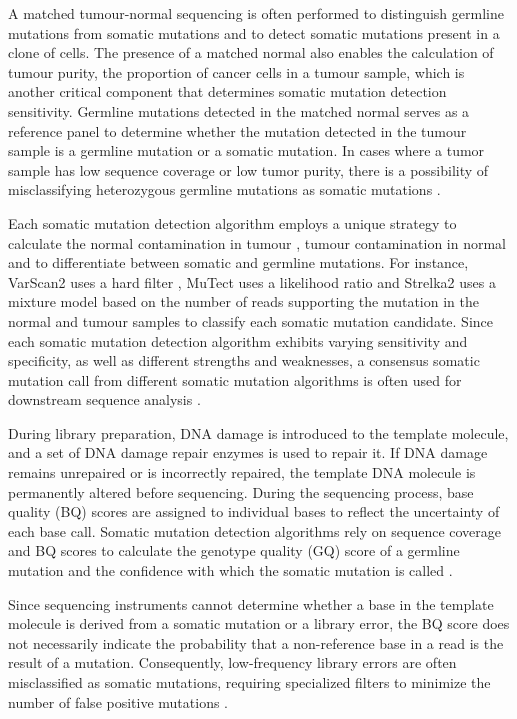 A matched tumour-normal sequencing is often performed to distinguish germline mutations from somatic mutations and to detect somatic mutations present in a clone of cells. The presence of a matched normal also enables the calculation of tumour purity, the proportion of cancer cells in a tumour sample, which is another critical component that determines somatic mutation detection sensitivity. Germline mutations detected in the matched normal serves as a reference panel to determine whether the mutation detected in the tumour sample is a germline mutation or a somatic mutation. In cases where a tumor sample has low sequence coverage or low tumor purity, there is a possibility of misclassifying heterozygous germline mutations as somatic mutations \cite{Cibulskis2013-gw}.

Each somatic mutation detection algorithm employs a unique strategy to calculate the normal contamination in tumour \cite{Cibulskis2011-tp}, tumour contamination in normal \cite{Taylor-Weiner2018-af} and to differentiate between somatic and germline mutations. For instance, VarScan2 uses a hard filter \cite{Koboldt2012-wd}, MuTect uses a likelihood ratio \cite{Cibulskis2013-gw} and Strelka2 uses a mixture model \cite{Kim2018-qi} based on the number of reads supporting the mutation in the normal and tumour samples to classify each somatic mutation candidate. Since each somatic mutation detection algorithm exhibits varying sensitivity and specificity, as well as different strengths and weaknesses, a consensus somatic mutation call from different somatic mutation algorithms is often used for downstream sequence analysis \cite{Bailey2020-ou}.

During library preparation, DNA damage is introduced to the template molecule, and a set of DNA damage repair enzymes is used to repair it. If DNA damage remains unrepaired or is incorrectly repaired, the template DNA molecule is permanently altered before sequencing. During the sequencing process, base quality (BQ) scores are assigned to individual bases to reflect the uncertainty of each base call. Somatic mutation detection algorithms rely on sequence coverage and BQ scores to calculate the genotype quality (GQ) score of a germline mutation \cite{McKenna2010-br, Li2011-ag} and the confidence with which the somatic mutation is called \cite{Cibulskis2013-gw}. 

Since sequencing instruments cannot determine whether a base in the template molecule is derived from a somatic mutation or a library error, the BQ score does not necessarily indicate the probability that a non-reference base in a read is the result of a mutation. Consequently, low-frequency library errors are often misclassified as somatic mutations, requiring specialized filters to minimize the number of false positive mutations \cite{Costello2013-cz, Chen2017-ba}.


